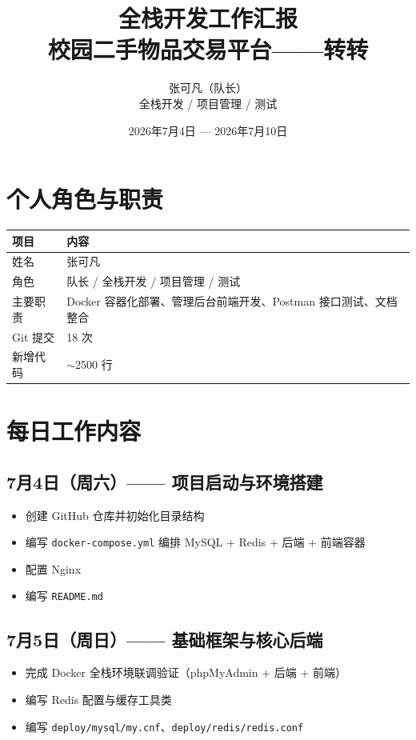 \documentclass[12pt,a4paper]{ctexart}
\title{{\Huge 全栈开发工作汇报}\\[0.3cm]{\Large 校园二手物品交易平台——转转}}
\author{{\large 张可凡（队长）}\\{\small 全栈开发 / 项目管理 / 测试}}
\date{2026年7月4日 — 2026年7月10日}
\begin{document}
\maketitle
\thispagestyle{fancy}

\section{个人角色与职责}

\begin{table}[H]
\centering
\begin{tabular}{lp{10cm}}
\toprule
\textbf{项目} & \textbf{内容} \\
\midrule
姓名 & 张可凡 \\
角色 & 队长 / 全栈开发 / 项目管理 / 测试 \\
主要职责 & Docker 容器化部署、管理后台前端开发、Postman 接口测试、文档整合 \\
Git 提交 & 18 次 \\
新增代码 & $\sim$2500 行 \\
\bottomrule
\end{tabular}
\end{table}

\section{每日工作内容}

\subsection{7月4日（周六）—— 项目启动与环境搭建}
\begin{itemize}
    \item 创建 GitHub 仓库并初始化目录结构
    \item 编写 \texttt{docker-compose.yml} 编排 MySQL + Redis + 后端 + 前端容器
    \item 配置 Nginx
    \item 编写 \texttt{README.md}
\end{itemize}

\subsection{7月5日（周日）—— 基础框架与核心后端}
\begin{itemize}
    \item 完成 Docker 全栈环境联调验证（phpMyAdmin + 后端 + 前端）
    \item 编写 Redis 配置与缓存工具类
    \item 编写 \texttt{deploy/mysql/my.cnf}、\texttt{deploy/redis/redis.conf}
\end{itemize}
\end{document}
